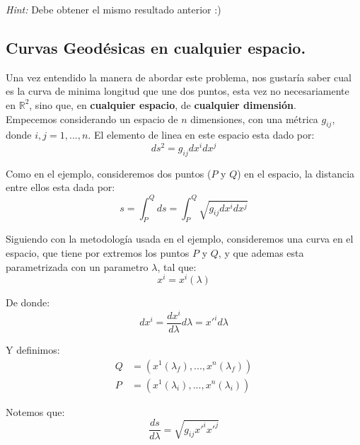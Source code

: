 \documentclass[paper=a4, fontsize=11pt,twoside]{scrartcl}
\begin{document}
\textit{Hint:} Debe obtener el mismo resultado anterior :)

\subsection{Curvas Geod\'esicas en cualquier espacio.}

Una vez entendido la manera de abordar este problema, nos gustar\'ia saber cual es la curva de minima longitud que une dos puntos, 
esta vez no necesariamente en $\mathbb{R}^{2}$, sino que, en \textbf{cualquier espacio}, de \textbf{cualquier dimensi\'on}. \\

Empecemos considerando un espacio de $n$ dimensiones, con una m\'etrica $g_{ij}$, donde $i,j = 1,...,n$. El elemento de linea en este espacio 
esta dado por:
	\begin{equation*}
		ds^{2} = g_{ij}dx^{i}dx^{j}
	\end{equation*}

Como en el ejemplo, consideremos dos puntos ($P$ y $Q$) en el espacio, la distancia entre ellos esta dada por:
	\begin{equation*}
		s = \int^{Q}_{P} ds = \int^{Q}_{P} \sqrt{g_{ij}dx^{i}dx^{j}}
	\end{equation*}

Siguiendo con la metodolog\'ia usada en el ejemplo, consideremos una curva en el espacio, que tiene por extremos los puntos $P$ y $Q$, 
y que ademas esta parametrizada con un parametro $\lambda$, tal que:
	\begin{equation*}
		x^{i} = x^{i} (\lambda)
	\end{equation*}

De donde:
	\begin{equation*}
		dx^{i} = \frac{dx^{i}}{d\lambda} d\lambda = x'^{i}d\lambda
	\end{equation*}
	
Y definimos:
	\begin{align*}
		Q &= \left( x^{1} \left(\lambda_{f} \right) ,...,  x^{n} \left(\lambda_{f} \right) \right) \\
		P &= \left( x^{1} \left(\lambda_{i} \right) ,...,  x^{n} \left(\lambda_{i} \right) \right)
	\end{align*}
	
Notemos que:
	\begin{equation*}
		\frac{ds}{d\lambda} = \sqrt{g_{ij}x'^{i}x'^{j}}
	\end{equation*}
\end{document}
